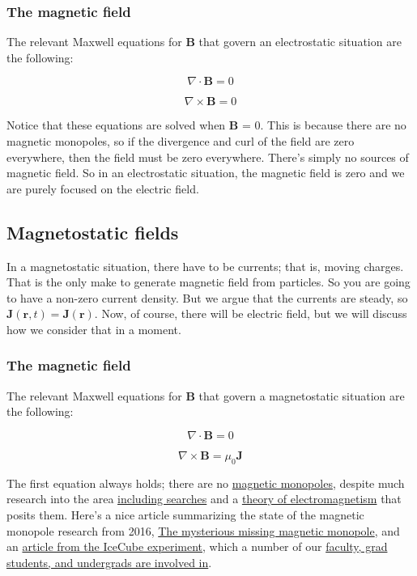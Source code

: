 \subsubsection{The magnetic field}\label{the-magnetic-field}

The relevant Maxwell equations for \(\mathbf{B}\) that govern an
electrostatic situation are the following:

\[\nabla \cdot \mathbf{B} = 0\]

\[\nabla \times \mathbf{B} = 0\]

Notice that these equations are solved when \(\mathbf{B}\) = 0. This is
because there are no magnetic monopoles, so if the divergence and curl
of the field are zero everywhere, then the field must be zero
everywhere. There's simply no sources of magnetic field. So in an
electrostatic situation, the magnetic field is zero and we are purely
focused on the electric field.

\subsection{Magnetostatic fields}\label{magnetostatic-fields}

In a magnetostatic situation, there have to be currents; that is, moving
charges. That is the only make to generate magnetic field from
particles. So you are going to have a non-zero current density. But we
argue that the currents are steady, so
\(\mathbf{J}(\mathbf{r},t) = \mathbf{J}(\mathbf{r})\). Now, of course,
there will be electric field, but we will discuss how we consider that
in a moment.

\subsubsection{The magnetic field}\label{the-magnetic-field-1}

The relevant Maxwell equations for \(\mathbf{B}\) that govern a
magnetostatic situation are the following:

\[\nabla \cdot \mathbf{B} = 0\]

\[\nabla \times \mathbf{B} = \mu_0 \mathbf{J}\]

The first equation always holds; there are no
\href{https://en.wikipedia.org/wiki/Magnetic_monopole}{magnetic
monopoles}, despite much research into the area
\href{https://en.wikipedia.org/wiki/Magnetic_monopole\#Searches_for_magnetic_monopoles}{including
searches} and a
\href{https://en.wikipedia.org/wiki/Magnetic_monopole\#In_SI_units}{theory
of electromagnetism} that posits them. Here's a nice article summarizing
the state of the magnetic monopole research from 2016,
\href{https://phys.org/news/2016-08-mysterious-magnetic-monopole.html}{The
mysterious missing magnetic monopole}, and an
\href{https://icecube.wisc.edu/news/research/2022/01/icecube-and-the-mystery-of-the-missing-magnetic-monopoles/}{article
from the IceCube experiment}, which a number of our
\href{https://pa.msu.edu/high-energy-physics/icecube-neutrino-observatory.aspx}{faculty,
grad students, and undergrads are involved in}.

